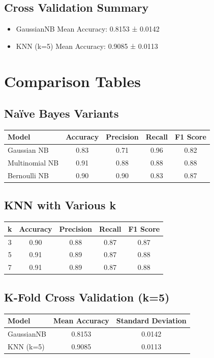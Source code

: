 \documentclass[12pt]{article}
\begin{document}
\subsection*{Cross Validation Summary}
\begin{itemize}
  \item GaussianNB Mean Accuracy: 0.8153 ± 0.0142
  \item KNN (k=5) Mean Accuracy: 0.9085 ± 0.0113
\end{itemize}

\section*{Comparison Tables}

\subsection*{Naïve Bayes Variants}
\begin{table}[H]
\centering
\begin{tabular}{lcccc}
\toprule
Model & Accuracy & Precision & Recall & F1 Score \\
\midrule
Gaussian NB & 0.83 & 0.71 & 0.96 & 0.82 \\
Multinomial NB & 0.91 & 0.88 & 0.88 & 0.88 \\
Bernoulli NB & 0.90 & 0.90 & 0.83 & 0.87 \\
\bottomrule
\end{tabular}
\end{table}

\subsection*{KNN with Various k}
\begin{table}[H]
\centering
\begin{tabular}{ccccc}
\toprule
k & Accuracy & Precision & Recall & F1 Score \\
\midrule
3 & 0.90 & 0.88 & 0.87 & 0.87 \\
5 & 0.91 & 0.89 & 0.87 & 0.88 \\
7 & 0.91 & 0.89 & 0.87 & 0.88 \\
\bottomrule
\end{tabular}
\end{table}

\subsection*{K-Fold Cross Validation (k=5)}
\begin{table}[H]
\centering
\begin{tabular}{lcc}
\toprule
Model & Mean Accuracy & Standard Deviation \\
\midrule
GaussianNB & 0.8153 & 0.0142 \\
KNN (k=5)  & 0.9085 & 0.0113 \\
\bottomrule
\end{tabular}
\end{table}
\end{document}
